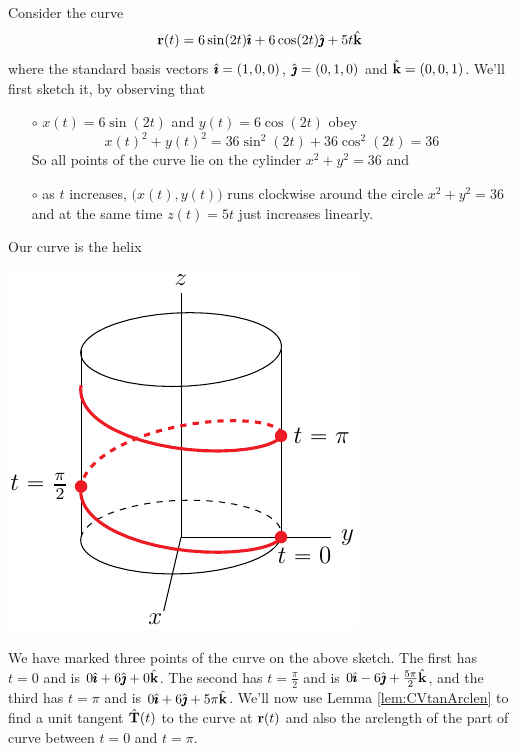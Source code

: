 \begin{eg}\label{eg:paramHelix}
Consider the curve
\begin{equation*}
\mathbf{r}(t) = 6\sin(2t)\hat{\pmb{\imath}} + 6\cos(2t)\hat{\pmb{\jmath}} +5t\hat{\mathbf{k}}
\end{equation*}
where the standard basis vectors $\hat{\pmb{\imath}} = (1,0,0)$, $\hat{\pmb{\jmath}}=(0,1,0)$ 
and $\hat{\mathbf{k}} =(0,0,1)$.
We'll first sketch it, by observing that
\begin{itemize}\itemsep1pt \parskip0pt  %
\item[$\circ$] $x(t)=6\sin(2t)$ and $y(t) =6\cos(2t)$ obey
\begin{equation*}
x(t)^2+y(t)^2 = 36 \sin^2(2t) + 36\cos^2(2t) = 36
\end{equation*}
So all points of the curve lie on the cylinder $x^2+y^2=36$ and
\item[$\circ$] as $t$ increases, $\big(x(t),y(t)\big)$ runs clockwise 
around the circle $x^2+y^2=36$ and at the same time $z(t) = 5t$ 
just increases linearly.
\end{itemize}
Our curve is the helix
\begin{efig}
\begin{center}
     \includegraphics{helix4.pdf}
\end{center}
\end{efig}
We have marked three points of the curve on the above sketch. The first has
$t=0$ and is $0\hat{\pmb{\imath}}+6\hat{\pmb{\jmath}}+0\hat{\mathbf{k}}$. The second has $t=\frac{\pi}{2}$ and is $0\hat{\pmb{\imath}}-6\hat{\pmb{\jmath}}+\frac{5\pi}{2}\hat{\mathbf{k}}$, and the third has $t=\pi$ and is 
$0\hat{\pmb{\imath}}+6\hat{\pmb{\jmath}}+5\pi\hat{\mathbf{k}}$.
We'll now use Lemma \ref{lem:CVtanArclen} to find a unit tangent
$\hat{\mathbf{T}}(t)$ to the curve at $\mathbf{r}(t)$ and also the arclength of the part of curve between $t=0$ and $t=\pi$.

\end{eg}
